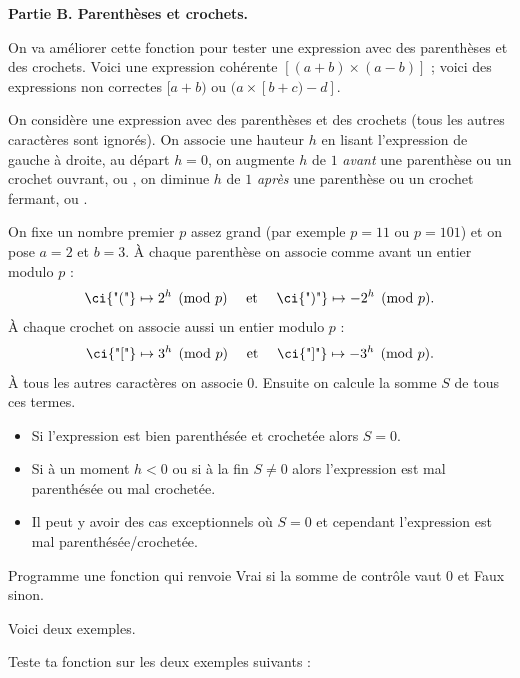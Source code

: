 \documentclass[11pt,class=report,crop=false]{standalone}
\begin{document}
\begin{activite}
\textbf{Partie B. Parenthèses et crochets.}

On va améliorer cette fonction pour tester une expression avec des parenthèses et des crochets.
Voici une expression cohérente \og{}$[(a+b)\times(a-b)]$\fg{} ; voici des expressions non correctes \og{}$[a+b)$\fg{} ou \og{}$(a\times[b+c)-d]$\fg{}.


On considère une expression avec des parenthèses et des crochets (tous les autres caractères sont ignorés). On associe une hauteur $h$ en lisant l'expression de gauche à droite, au départ 
$h=0$, on augmente $h$ de $1$ \emph{avant} une parenthèse ou un crochet ouvrant,  ou \ci{"["}, on diminue $h$ de $1$ \emph{après} une parenthèse ou un crochet fermant,  ou  \ci{"]"}.

On fixe un nombre premier $p$ assez grand (par exemple $p=11$ ou $p=101$) et on pose $a=2$ et $b=3$.
\`A chaque parenthèse on associe comme avant un entier modulo $p$ :
$$ \text{\ci{"("}} \mapsto 2^h \pmod{p} \quad \text{ et }\quad \text{\ci{")"}} \mapsto -2^h \pmod{p}.$$
\`A chaque crochet on associe aussi un entier modulo $p$ :
$$ \text{\ci{"["}} \mapsto 3^h \pmod{p} \quad \text{ et }\quad \text{\ci{"]"}} \mapsto -3^h \pmod{p}.$$
\`A tous les autres caractères on associe $0$.
Ensuite on calcule la somme $S$ de tous ces termes.



\begin{itemize}
	\item Si l'expression est bien parenthésée et crochetée alors $S=0$.
	\item Si à un moment $h<0$ ou si à la fin $S \neq 0$ alors l'expression est mal parenthésée ou mal crochetée.
	\item Il peut y avoir des cas exceptionnels où $S=0$ et cependant l'expression est mal parenthésée/crochetée.
\end{itemize}

Programme une fonction  qui renvoie
\og{}Vrai\fg{} si la somme de contrôle vaut $0$ et \og{}Faux\fg{} sinon.


Voici deux exemples.


Teste ta fonction sur les deux exemples suivants :
\mycenterline{\ci{"[[[()](()[((([[]])()(([[[]][()]]])))])]]"}}



\end{activite}
\end{document}
